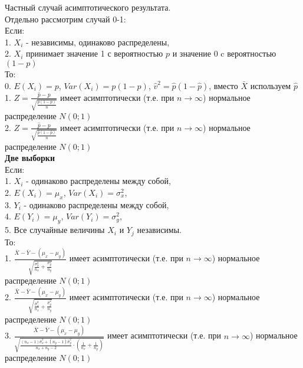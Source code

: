 \documentclass[pdftex,12pt,a4paper]{article}
\begin{document}
Частный случай асимптотического результата. \\
Отдельно рассмотрим случай 0-1: \\
Если: \\
1. $X_{i}$ - независимы, одинаково распределены, \\
2. $X_{i}$ принимает значение 1 с вероятностью $p$ и значение 0 c вероятностью $(1-p)$ \\
То: \\
0. $E(X_{i})=p$, $Var(X_{i})=p(1-p)$,
$\hat{v}^{2}=\hat{p}(1-\hat{p})$, вместо $\bar{X}$ используем
$\hat{p}$  \\
1. $Z=\frac{\hat{p}-p}{\sqrt{\frac{p(1-p)}{n}}}$
имеет
 асимптотически  (т.е. при $n\to\infty$) нормальное распределение $N(0;1)$ \\
2. $Z=\frac{\hat{p}-p}{\sqrt{\frac{\hat{p}(1-\hat{p})}{n}}}$ имеет
 асимптотически  (т.е. при $n\to\infty$) нормальное распределение $N(0;1)$ \\

\textbf{Две выборки} \\


Если: \\
1. $X_{i}$ - одинаково распределены между собой, \\
2. $E(X_{i})=\mu_{x}$, $Var(X_{i})=\sigma_{x}^{2}$, \\
3. $Y_{i}$ - одинаково распределены между собой, \\
4. $E(Y_{i})=\mu_{y}$, $Var(Y_{i})=\sigma_{y}^{2}$, \\
5. Все случайные величины $X_{i}$ и $Y_{j}$ независимы. \\
То: \\
1. $\frac{\bar{X}-\bar{Y}-(\mu_{x}-\mu_{y})} {\sqrt
    {
    \frac{\sigma_{x}^{2}}{n_{x}}+\frac{\sigma_{y}^{2}}{n_{y}}
    }
}$ имеет
 асимптотически  (т.е. при $n\to\infty$) нормальное распределение $N(0;1)$ \\
2. $\frac{\bar{X}-\bar{Y}-(\mu_{x}-\mu_{y})} {\sqrt
    {
    \frac{\hat{\sigma}_{x}^{2}}{n_{x}}+\frac{\hat{\sigma}_{y}^{2}}{n_{y}}
    }
}$ имеет
 асимптотически  (т.е. при $n\to\infty$) нормальное распределение $N(0;1)$ \\
3. $\frac{\bar{X}-\bar{Y}-(\mu_{x}-\mu_{y})} { \sqrt{
    \frac{(n_{x}-1)\hat{\sigma}_{x}^{2}+(n_{y}-1)\hat{\sigma}_{y}^{2}}{n_{x}+n_{y}-2}
    \cdot
    \left(\frac{1}{n_{x}}+\frac{1}{n_{y}}\right)
    }
}$ имеет асимптотически  (т.е. при $n\to\infty$) нормальное распределение $N(0;1)$ \\
\end{document}

